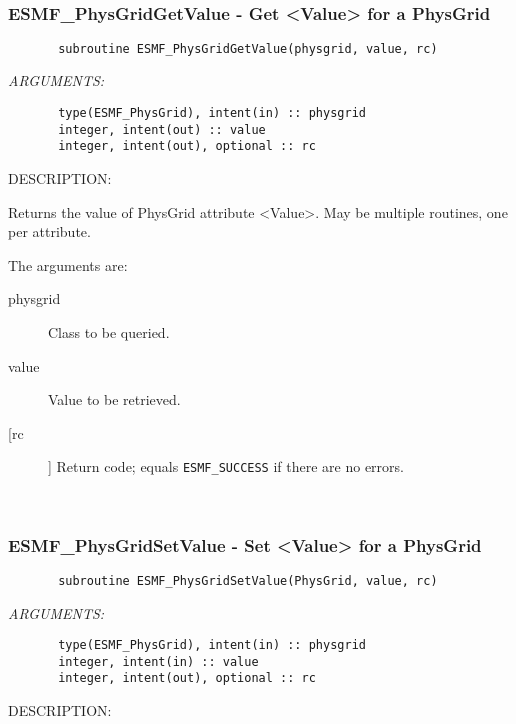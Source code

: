 
\mbox{}\hrulefill\ 
 
\subsubsection{ESMF\_PhysGridGetValue - Get <Value> for a PhysGrid}


 
\begin{verbatim}       subroutine ESMF_PhysGridGetValue(physgrid, value, rc)\end{verbatim}{\em ARGUMENTS:}
\begin{verbatim}       type(ESMF_PhysGrid), intent(in) :: physgrid
       integer, intent(out) :: value
       integer, intent(out), optional :: rc             
 \end{verbatim}
{\sf DESCRIPTION:\\ }


       Returns the value of PhysGrid attribute <Value>.
       May be multiple routines, one per attribute.
  
       The arguments are:
       \begin{description}
       \item[physgrid] 
            Class to be queried.
       \item[value]
            Value to be retrieved.         
       \item[[rc]] 
            Return code; equals {\tt ESMF\_SUCCESS} if there are no errors.
       \end{description}
   
 
\mbox{}\hrulefill\ 
 
\subsubsection{ESMF\_PhysGridSetValue - Set <Value> for a PhysGrid}


 
\begin{verbatim}       subroutine ESMF_PhysGridSetValue(PhysGrid, value, rc)\end{verbatim}{\em ARGUMENTS:}
\begin{verbatim}       type(ESMF_PhysGrid), intent(in) :: physgrid
       integer, intent(in) :: value
       integer, intent(out), optional :: rc            
 \end{verbatim}
{\sf DESCRIPTION:\\ }


